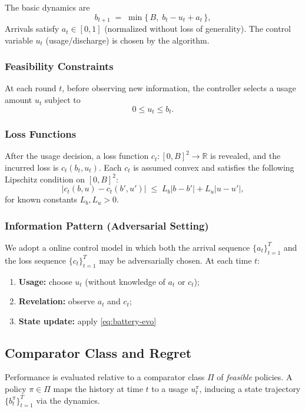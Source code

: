 The basic dynamics are
\begin{equation}
\label{eq:battery-evo}
b_{t+1} \;=\; \min\{\,B,\; b_t - u_t + a_t\,\},
\end{equation}
Arrivals satisfy \(a_t \in [0,1]\) (normalized without loss of generality).  
The control variable \(u_t\) (usage/discharge) is chosen by the algorithm.

\subsubsection{Feasibility Constraints}
At each round \(t\), before observing new information, the controller selects a usage amount \(u_t\) subject to
\[
0 \le u_t \le b_t .
\]

\subsubsection{Loss Functions}
After the usage decision, a loss function \(c_t : [0,B]^2 \to \mathbb{R}\) is revealed, and the incurred loss is \(c_t(b_t,u_t)\).  
Each \(c_t\) is assumed convex and satisfies the following Lipschitz condition on \([0,B]^2\):
\begin{equation}
\label{eq:Lip}
|c_t(b,u) - c_t(b',u')|
\;\leq\;
L_b |b-b'| + L_u |u-u'|,
\end{equation}
for known constants \(L_b,L_u > 0\).

\subsubsection{Information Pattern (Adversarial Setting)}
We adopt a online control model in which both the arrival sequence \(\{a_t\}_{t=1}^T\) and the loss sequence \(\{c_t\}_{t=1}^T\) may be adversarially chosen.  
At each time \(t\):
\begin{enumerate}
    \item \textbf{Usage:} choose \(u_t\) (without knowledge of \(a_t\) or \(c_t\));
    \item \textbf{Revelation:} observe \(a_t\) and \(c_t\);
    \item \textbf{State update:} apply \eqref{eq:battery-evo} 
\end{enumerate}



\subsection{Comparator Class and Regret}
Performance is evaluated relative to a comparator class \(\Pi\) of \textit{feasible} policies.  
A policy \(\pi\in\Pi\) maps the history at time \(t\) to a usage \(u_t^\pi\), inducing a state trajectory \(\{b_t^\pi\}_{t=1}^T\) via the dynamics.  

